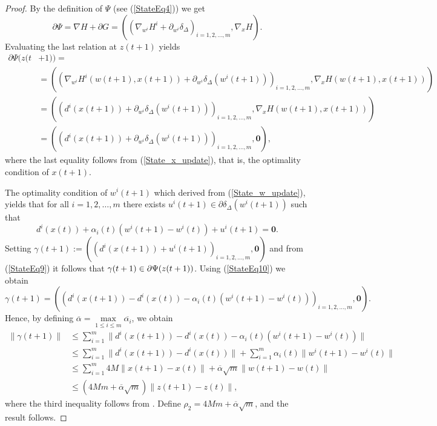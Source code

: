 \documentclass[11pt]{article}
\numberwithin{equation}{section}
\begin{document}
\begin{proof}
By the definition of $\Psi$ (see (\ref{StateEq4})) we get
\begin{equation*}
	\partial \Psi = \nabla H + \partial G  
= \left( \left( \nabla_{w^i} H^i + \partial_{w^i} \delta_{\Delta} \right)_{i=1,2, \ldots ,m} , \nabla_x H \right) .
\end{equation*}
Evaluating the last relation at $z(t+1)$ yields
\begin{align}
	\partial \Psi(z(t & + 1)) = \\
	& = \left( \left( \nabla_{w^i} H^i(w(t+1),x(t+1)) + \partial_{w^i} \delta_{\Delta}(w^i(t+1)) \right)_{i=1,2, \ldots ,m} , \nabla_x H(w(t+1),x(t+1)) \right) \\
	& = \left( \left( d^i(x(t+1)) + \partial_{w^i} \delta_{\Delta}(w^i(t+1)) \right)_{i=1,2, \ldots ,m} , \nabla_x H(w(t+1),x(t+1)) \right) \\
	& = \left( \left( d^i(x(t+1)) + \partial_{w^i} \delta_{\Delta}(w^i(t+1)) \right)_{i=1,2, \ldots ,m} , \mathbf{0} \right) , \label{StateEq9}
\end{align}
where the last equality follows from (\ref{State_x_update}), that is, the optimality condition of $x(t+1)$.

The optimality condition of $w^i(t+1)$ which derived from (\ref{State_w_update}), yields that for all $i=1, 2, \ldots ,m$ there exists $u^i(t+1) \in \partial \delta_{\Delta}(w^i(t+1))$ such that
\begin{equation}
	d^i(x(t)) + \alpha_i(t) \left( w^i(t+1) - w^i(t) \right) + u^i(t+1) = \mathbf{0} . \label{StateEq10}
\end{equation}
Setting $\gamma(t+1) := \left( \left( d^i(x(t+1)) + u^i(t+1) \right)_{i=1,2, \ldots ,m}, \mathbf{0} \right)$ and from (\ref{StateEq9}) it follows that $\gamma(t+1) \in \\ \partial \Psi(z(t+1))$. Using (\ref{StateEq10}) we obtain
\begin{equation*}
	\gamma(t+1) = \left( \left( d^i(x(t+1)) - d^i(x(t)) - \alpha_i(t)(w^i(t+1) - w^i(t)) \right)_{i=1,2, \ldots, m}, \mathbf{0} \right).
\end{equation*}
Hence, by defining $\overline{\alpha} = \max\limits_{1 \leq i \leq m} \overline{\alpha_i}$, we obtain
\begin{align*}
	\| \gamma(t+1) \|
	& \leq \sum\limits_{i=1}^{m} \| d^i(x(t+1)) - d^i(x(t)) - \alpha_i(t) \left( w^i(t+1) - w^i(t) \right) \| \\
	& \leq \sum\limits_{i=1}^{m} \| d^i(x(t+1)) - d^i(x(t)) \| + \sum\limits_{i=1}^{m} \alpha_i(t) \| w^i(t+1) - w^i(t) \| \\
	& \leq \sum\limits_{i=1}^{m} 4M \| x(t+1) - x(t) \| +  \overline{\alpha} \sqrt{m}\|w(t+1) - w(t)\| \\
	& \leq \left( 4Mm + \overline{\alpha}\sqrt{m} \right) \|z(t+1) - z(t)\| , 
\end{align*}
where the third inequality follows from . Define $\rho_2 = 4Mm + \overline{\alpha}\sqrt{m}$, and the result follows.
\end{proof}
\end{document}
